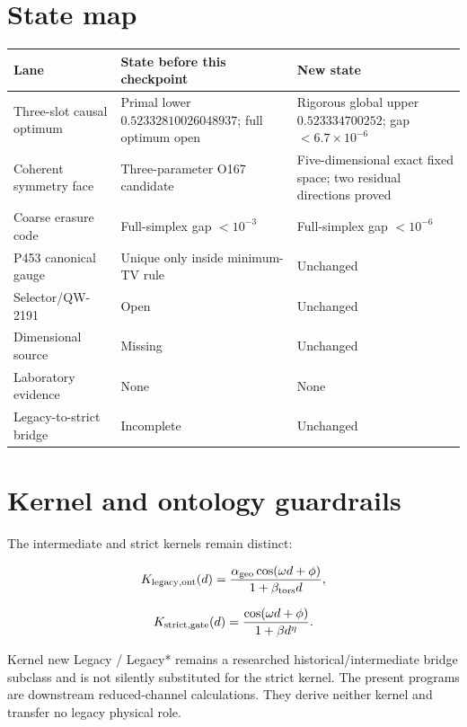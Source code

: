 \documentclass[11pt,a4paper,openany]{report}
\begin{document}
\section{State map}

\begin{center}
\begingroup\small
\setlength{\tabcolsep}{2.5pt}
\renewcommand{\arraystretch}{1.16}
\begin{longtable}{@{}p{}p{}p{}@{}}
\toprule
\textbf{Lane} & \textbf{State before this checkpoint} & \textbf{New state} \\
\midrule
\endhead
Three-slot causal optimum & Primal lower \(0.52332810026048937\); full optimum open & Rigorous global upper \(0.523334700252\); gap \(<6.7\times10^{-6}\) \\
Coherent symmetry face & Three-parameter O167 candidate & Five-dimensional exact fixed space; two residual directions proved \\
Coarse erasure code & Full-simplex gap \(<10^{-3}\) & Full-simplex gap \(<10^{-6}\) \\
P453 canonical gauge & Unique only inside minimum-TV rule & Unchanged \\
Selector/\allowbreak{}QW-2191 & Open & Unchanged \\
Dimensional source & Missing & Unchanged \\
Laboratory evidence & None & None \\
Legacy-to-strict bridge & Incomplete & Unchanged \\
\bottomrule
\end{longtable}
\endgroup
\end{center}

\section{Kernel and ontology guardrails}

The intermediate and strict kernels remain distinct:

\[
K_{\rm legacy,ont}(d)=
\frac{\alpha_{\rm geo}\cos(\omega d+\phi)}{1+\beta_{\rm tors}d},
\]

\[
K_{\rm strict,gate}(d)=
\frac{\cos(\omega d+\phi)}{1+\beta d^\eta}.
\]

Kernel new Legacy /\allowbreak{} Legacy* remains a researched historical/\allowbreak{}intermediate bridge subclass and is not silently substituted for the strict kernel. The present programs are downstream reduced-channel calculations. They derive neither kernel and transfer no legacy physical role.
\end{document}
